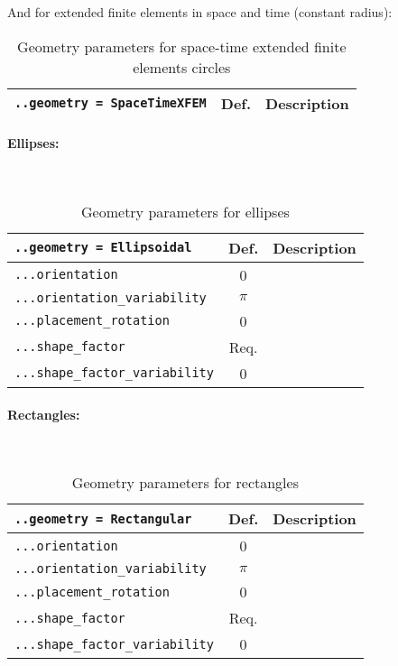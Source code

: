 \documentclass[10pt]{article}
\newcommand{\whiteline}{\textcolor{white}{.\\}}
\begin{document}
And for extended finite elements in space and time (constant radius):

\begin{table}[h!]
\begin{tabularx}{\textwidth}{lcX}
\verb+..geometry = SpaceTimeXFEM+ & Def. & Description\\
\hline
\end{tabularx}
\caption{Geometry parameters for space-time extended finite elements circles}
\end{table}


\paragraph{Ellipses:} \whiteline

\begin{table}[h!]
\begin{tabularx}{\textwidth}{lcX}
\verb+..geometry = Ellipsoidal+ & Def. & Description\\
\hline
\verb+...orientation+ & 0 & \\
\verb+...orientation_variability+ & $\pi$ & \\
\verb+...placement_rotation+ & 0 & \\
\verb+...shape_factor+ &  Req. & \\
\verb+...shape_factor_variability+ & 0 & \\
\hline
\end{tabularx}
\caption{Geometry parameters for ellipses}
\end{table}

\paragraph{Rectangles:} \whiteline

\begin{table}[h!]
\begin{tabularx}{\textwidth}{lcX}
\verb+..geometry = Rectangular+ & Def. & Description\\
\hline
\verb+...orientation+ & 0 & \\
\verb+...orientation_variability+ & $\pi$ & \\
\verb+...placement_rotation+ & 0 & \\
\verb+...shape_factor+ &  Req. & \\
\verb+...shape_factor_variability+ & 0 & \\
\hline
\end{tabularx}
\caption{Geometry parameters for rectangles}
\end{table}
\end{document}
